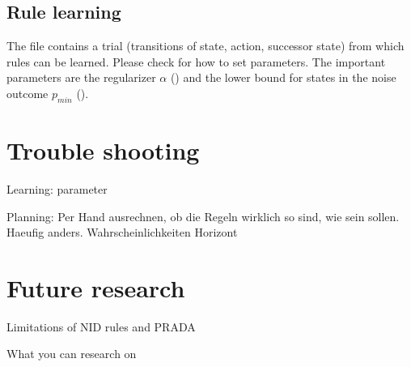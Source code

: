 \documentclass[10pt,twoside,twocolumn,fleqn]{article}
\begin{document}
\subsection{Rule learning}

The file  contains a trial (transitions of state, action,
successor state) from which rules can be learned. Please check
 for how to set parameters. The important parameters are the
regularizer $\alpha$ () and the lower bound for states in
the noise outcome $p_{min}$ ().




\section{Trouble shooting}

Learning:
parameter

Planning:
Per Hand ausrechnen, ob die Regeln wirklich so sind, wie sein sollen.
Haeufig anders.
Wahrscheinlichkeiten
Horizont






\section{Future research}

Limitations of NID rules and PRADA

What you can research on 



\end{document}
